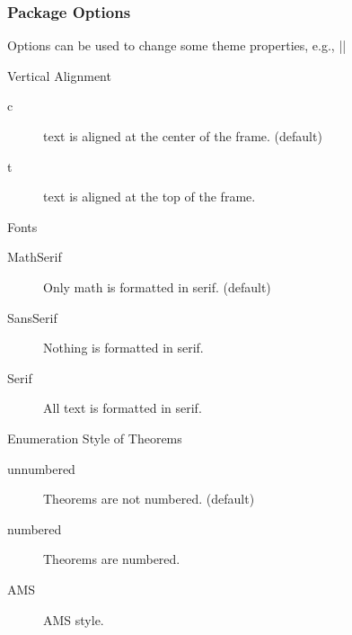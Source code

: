 \documentclass{beamer}
\begin{document}
\begin{frame}
  \frametitle{Package Options}

  Options can be used to change some theme properties, e.g.,
  ||

  \begin{block}{Vertical Alignment}
    \begin{description}
      \item[c] text is aligned at the center of the frame. (default)
      \item[t] text is aligned at the top of the frame.
    \end{description}
  \end{block}

  \begin{block}{Fonts}
    \begin{description}
      \item[MathSerif]  Only math is formatted in serif. (default)
      \item[SansSerif]  Nothing is formatted in serif.
      \item[Serif]  All text is formatted in serif.
    \end{description}
  \end{block}

  \begin{block}{Enumeration Style of Theorems}
    \begin{description}
      \item[unnumbered]  Theorems are not numbered. (default)
      \item[numbered]  Theorems are numbered.
      \item[AMS]  AMS style.
    \end{description}
  \end{block}

\end{frame}

\showlogo
\end{document}

